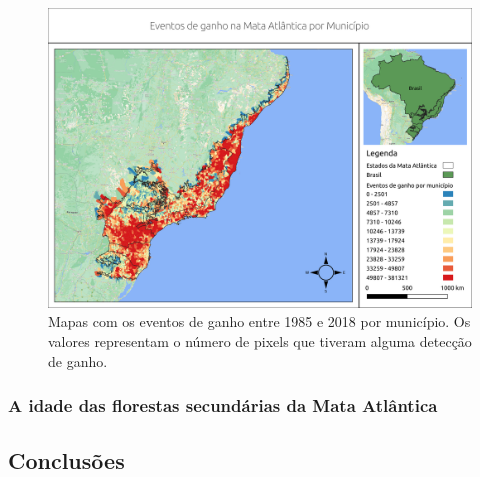 \begin{figure}[H]
    \centering
    \includegraphics[scale=.5]{images/mun_gain_seg6_masked18_dur_gt4_inv_for.png}
    \caption{Mapas com os eventos de ganho entre 1985 e 2018 por município. Os valores representam o número de pixels que tiveram alguma detecção de ganho.}
    \label{fig:mun_gain}
\end{figure}

\subsubsection{A idade das florestas secundárias da Mata Atlântica}

\subsection{Conclusões}